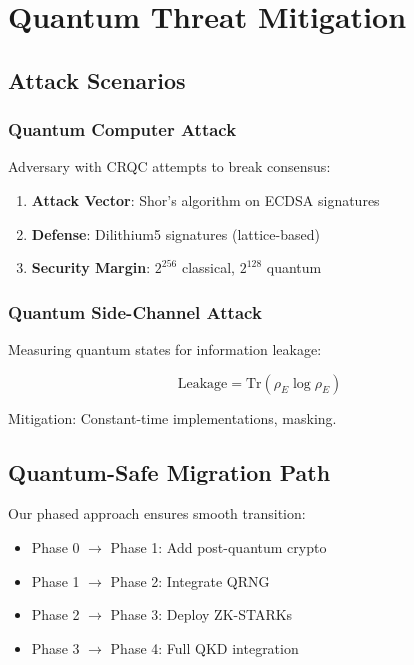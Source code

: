 \documentclass[11pt,a4paper]{article}
\begin{document}
\section{Quantum Threat Mitigation}

\subsection{Attack Scenarios}

\subsubsection{Quantum Computer Attack}

Adversary with CRQC attempts to break consensus:
\begin{enumerate}
    \item \textbf{Attack Vector}: Shor's algorithm on ECDSA signatures
    \item \textbf{Defense}: Dilithium5 signatures (lattice-based)
    \item \textbf{Security Margin}: $2^{256}$ classical, $2^{128}$ quantum
\end{enumerate}

\subsubsection{Quantum Side-Channel Attack}

Measuring quantum states for information leakage:

\begin{equation}
\text{Leakage} = \text{Tr}(\rho_E \log \rho_E)
\end{equation}

Mitigation: Constant-time implementations, masking.

\subsection{Quantum-Safe Migration Path}

Our phased approach ensures smooth transition:
\begin{itemize}
    \item Phase 0 $\rightarrow$ Phase 1: Add post-quantum crypto
    \item Phase 1 $\rightarrow$ Phase 2: Integrate QRNG
    \item Phase 2 $\rightarrow$ Phase 3: Deploy ZK-STARKs
    \item Phase 3 $\rightarrow$ Phase 4: Full QKD integration
\end{itemize}
\end{document}
